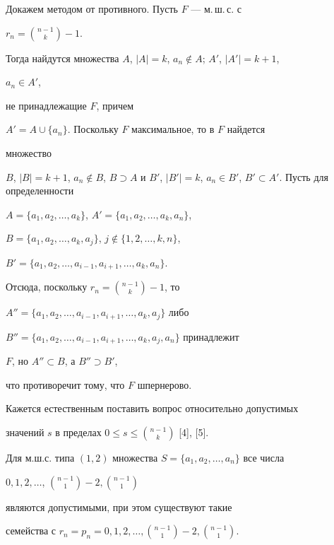 \begin{pf} 


Докажем методом от противного. Пусть $F$ --- м.\,ш.\,с. с 


$r_n=\binom{n-1}{k}-1$. 


Тогда найдутся множества $A$, $|A|=k$, $a_n\notin A$; $A'$, $|A'|=k+1$, 


$a_n\in A'$, 


не принадлежащие $F$, причем 


$A'=A\cup\{a_n\}$. Поскольку $F$ максимальное, то в $F$ найдется 


множество 


$B$, $|B|=k+1$, $a_n\notin B$, $B\supset A$ и $B'$, $|B'|=k$, $a_n\in 


B'$, $B'\subset A'$. Пусть для определенности 


$A=\{a_1,a_2,\dotsc,a_k\}$, $A'=\{a_1,a_2,\dotsc,a_k,a_n\}$, 


$B=\{a_1,a_2,\dotsc,a_k,a_j\}$, $j\notin\{1,2,\dotsc,k,n\}$, 


$B'=\{a_1,a_2,\dotsc,a_{i-1},a_{i+1},\dotsc,a_k,a_n\}$. 


Отсюда, поскольку $r_n=\binom{n-1}{k}-1$, то 


$A''=\{a_1,a_2,\dotsc,a_{i-1},a_{i+1},\dotsc,a_k,a_j\}$ либо 


$B''=\{a_1,a_2,\dotsc,a_{i-1},a_{i+1},\dotsc,a_k,a_j,a_n\}$ принадлежит 


$F$, но $A''\subset B$, а $B''\supset B'$, 


что противоречит тому, что $F$ шпернерово. 


\end{pf} 


 


Кажется естественным поставить вопрос относительно допустимых 


значений $s$ в пределах $0\le s\le\binom{n-1}{k}$ [4], [5]. 


 


 


\begin{thm} 


Для м.ш.с. типа $(1,2)$ множества $S=\{a_1,a_2,\dotsc,a_n\}$ все числа 


$0,1,2,\dotsc$, $\binom{n-1}{1}-2, \binom{n-1}{1}$




являются допустимыми, при этом существуют такие 


семейства с $r_n=p_n=0,1,2,\dotsc, \binom{n-1}{1}-2, \binom{n-1}{1}$. 


\end{thm} 


